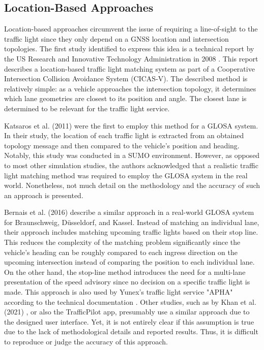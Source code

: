 \subsection{Location-Based Approaches}

Location-based approaches circumvent the issue of requiring a line-of-sight to the traffic light since they only depend on a GNSS location and intersection topologies. The first study identified to express this idea is a technical report by the US Research and Innovative Technology Administration in 2008 \cite{cicas-v}. This report describes a location-based traffic light matching system as part of a Cooperative Intersection Collision Avoidance System (CICAS-V). The described method is relatively simple: as a vehicle approaches the intersection topology, it determines which lane geometries are closest to its position and angle. The closest lane is determined to be relevant for the traffic light service.

Katsaros et al. (2011) \cite{katsaros_performance_2011} were the first to employ this method for a GLOSA system. In their study, the location of each traffic light is extracted from an obtained topology message and then compared to the vehicle's position and heading. Notably, this study was conducted in a SUMO environment. However, as opposed to most other simulation studies, the authors acknowledged that a realistic traffic light matching method was required to employ the GLOSA system in the real world. Nonetheless, not much detail on the methodology and the accuracy of such an approach is presented.

Bernais et al. (2016) \cite{bernais_design_2016} describe a similar approach in a real-world GLOSA system for Braunschweig, Düsseldorf, and Kassel. Instead of matching an individual lane, their approach includes matching upcoming traffic lights based on their stop line. This reduces the complexity of the matching problem significantly since the vehicle's heading can be roughly compared to each ingress direction on the upcoming intersection instead of comparing the position to each individual lane. On the other hand, the stop-line method introduces the need for a multi-lane presentation of the speed advisory since no decision on a specific traffic light is made. This approach is also used by Yunex's traffic light service "APHA" according to the technical documentation \cite{yunex_traffic_v2x-kommunikation_2023}. Other studies, such as by Khan et al. (2021) \cite{khan_eco-drive_2021}, or also the TrafficPilot app, presumably use a similar approach due to the designed user interface. Yet, it is not entirely clear if this assumption is true due to the lack of methodological details and reported results. Thus, it is difficult to reproduce or judge the accuracy of this approach.

